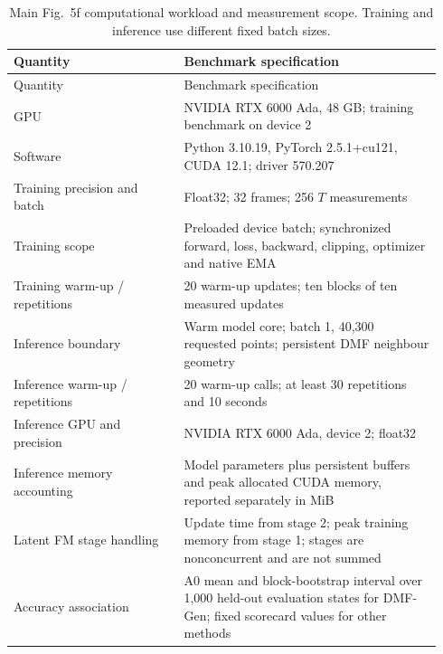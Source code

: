 \documentclass[11pt]{article}
\begin{document}
{\small
\begin{longtable}{@{}P{0.37\linewidth} P{0.57\linewidth}@{}}
\caption{Main Fig.~5f computational workload and measurement scope. Training and inference use different fixed batch sizes.}\label{tab:timing}\\
\toprule Quantity & Benchmark specification \\
\midrule\endfirsthead
\toprule Quantity & Benchmark specification \\
\midrule\endhead
\bottomrule\endlastfoot
GPU & NVIDIA RTX 6000 Ada, 48 GB; training benchmark on device 2 \\
Software & Python 3.10.19, PyTorch 2.5.1+cu121, CUDA 12.1; driver 570.207 \\
Training precision and batch & Float32; 32 frames; 256 $T$ measurements \\
Training scope & Preloaded device batch; synchronized forward, loss, backward, clipping, optimizer and native EMA \\
Training warm-up / repetitions & 20 warm-up updates; ten blocks of ten measured updates \\
Inference boundary & Warm model core; batch 1, 40,300 requested points; persistent DMF neighbour geometry \\
Inference warm-up / repetitions & 20 warm-up calls; at least 30 repetitions and 10 seconds \\
Inference GPU and precision & NVIDIA RTX 6000 Ada, device 2; float32 \\
Inference memory accounting & Model parameters plus persistent buffers and peak allocated CUDA memory, reported separately in MiB \\
Latent FM stage handling & Update time from stage 2; peak training memory from stage 1; stages are nonconcurrent and are not summed \\
Accuracy association & A0 mean and block-bootstrap interval over 1,000 held-out evaluation states for DMF-Gen; fixed scorecard values for other methods \\
\end{longtable}
}

\FloatBarrier
\end{document}
